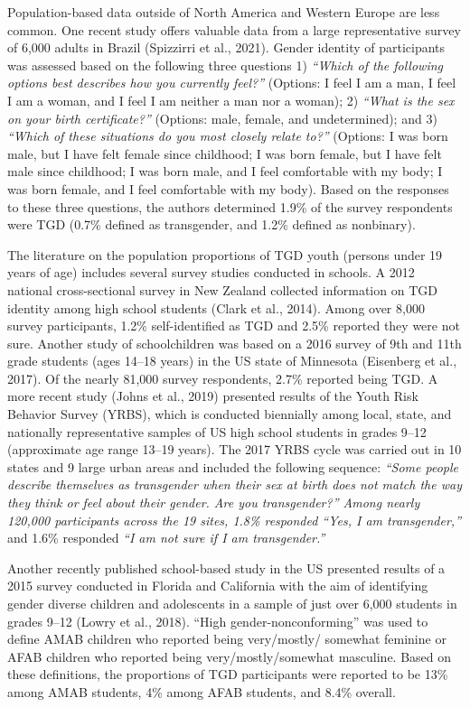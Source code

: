 \documentclass[
]{book}
\begin{document}
Population-based data outside of North
America and Western Europe are less common.
One recent study offers valuable data from a large
representative survey of 6,000 adults in Brazil
(Spizzirri et al., 2021). Gender identity of participants was assessed based on the following three
questions 1) \emph{``Which of the following options best
describes how you currently feel?''} (Options: I feel
I am a man, I feel I am a woman, and I feel I
am neither a man nor a woman); 2) \emph{``What is
the sex on your birth certificate?''} (Options: male,
female, and undetermined); and 3) \emph{``Which of
these situations do you most closely relate to?''}
(Options: I was born male, but I have felt female
since childhood; I was born female, but I have
felt male since childhood; I was born male, and
I feel comfortable with my body; I was born
female, and I feel comfortable with my body).
Based on the responses to these three questions,
the authors determined 1.9\% of the survey
respondents were TGD (0.7\% defined as transgender, and 1.2\% defined as nonbinary).

The literature on the population proportions
of TGD youth (persons under 19 years of age)
includes several survey studies conducted in
schools. A 2012 national cross-sectional survey
in New Zealand collected information on TGD
identity among high school students (Clark et al.,
2014). Among over 8,000 survey participants,
1.2\% self-identified as TGD and 2.5\% reported
they were not sure. Another study of schoolchildren was based on a 2016 survey of 9th and 11th
grade students (ages 14--18 years) in the US state
of Minnesota (Eisenberg et al., 2017). Of the
nearly 81,000 survey respondents, 2.7\% reported
being TGD. A more recent study (Johns et al.,
2019) presented results of the Youth Risk Behavior
Survey (YRBS), which is conducted biennially
among local, state, and nationally representative
samples of US high school students in grades
9--12 (approximate age range 13--19 years). The
2017 YRBS cycle was carried out in 10 states and
9 large urban areas and included the following
sequence: \emph{``Some people describe themselves as
transgender when their sex at birth does not match
the way they think or feel about their gender. Are
you transgender?\emph{'' Among nearly 120,000 participants across the 19 sites, 1.8\% responded }``Yes,
I am transgender,''} and 1.6\% responded \emph{``I am not
sure if I am transgender.''}

Another recently published school-based study
in the US presented results of a 2015 survey
conducted in Florida and California with the aim
of identifying gender diverse children and adolescents in a sample of just over 6,000 students
in grades 9--12 (Lowry et al., 2018). ``High
gender-nonconforming'' was used to define
AMAB children who reported being very/mostly/
somewhat feminine or AFAB children who
reported being very/mostly/somewhat masculine.
Based on these definitions, the proportions of
TGD participants were reported to be 13\% among
AMAB students, 4\% among AFAB students, and
8.4\% overall.
\end{document}
